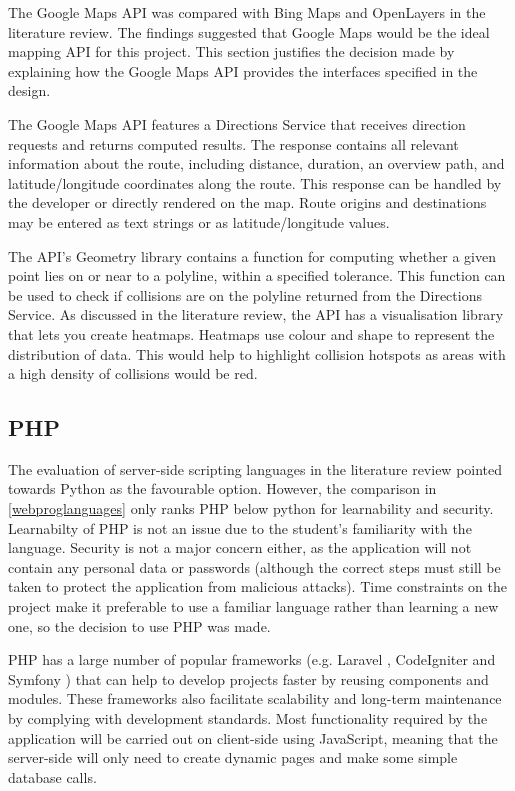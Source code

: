 \documentclass[authoryearcitations]{UoYCSproject}
\begin{document}
The Google Maps API \citep{Google} was compared with Bing Maps and OpenLayers in the literature review. The findings suggested that Google Maps would be the ideal mapping API for this project. This section justifies the decision made by explaining how the Google Maps API provides the interfaces specified in the design.

The Google Maps API features a Directions Service that receives direction requests and returns computed results. The response contains all relevant information about the route, including distance, duration, an overview path, and latitude/longitude coordinates along the route. This response can be handled by the developer or directly rendered on the map. Route origins and destinations may be entered as text strings or as latitude/longitude values. 

The API's Geometry library contains a function for computing whether a given point lies on or near to a polyline, within a specified tolerance. This function can be used to check if collisions are on the polyline returned from the Directions Service. As discussed in the literature review, the API has a visualisation library that lets you create heatmaps. Heatmaps use colour and shape to represent the distribution of data. This would help to highlight collision hotspots as areas with a high density of collisions would be red.

\subsection{PHP}

The evaluation of server-side scripting languages in the literature review pointed towards Python as the favourable option. However, the comparison in \autoref{webproglanguages} only ranks PHP below python for learnability and security. Learnabilty of PHP is not an issue due to the student's familiarity with the language. Security is not a major concern either, as the application will not contain any personal data or passwords (although the correct steps must still be taken to protect the application from malicious attacks). Time constraints on the project make it preferable to use a familiar language rather than learning a new one, so the decision to use PHP was made.

PHP has a large number of popular frameworks (e.g. Laravel \citep{Laravel}, CodeIgniter \citep{codeIgniter} and Symfony \citep{SensioLabs}) that can help to develop projects faster by reusing components and modules. These frameworks also facilitate scalability and long-term maintenance by complying with development standards. Most functionality required by the application will be carried out on client-side using JavaScript, meaning that the server-side will only need to create dynamic pages and make some simple database calls. 
\end{document}
